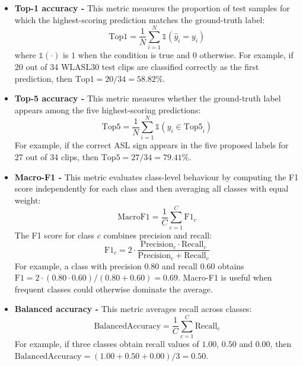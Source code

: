 \begin{itemize}
    \item \textbf{Top-1 accuracy - } This metric measures the proportion of test samples for which the
          highest-scoring prediction matches the ground-truth label:
          \begin{equation}
              \mathrm{Top1} = \frac{1}{N}\sum_{i=1}^{N}\mathbb{1}(\hat{y}_i = y_i)
          \end{equation}
          where $\mathbb{1}(\cdot)$ is $1$ when the condition is true and $0$ otherwise. For example,
          if 20 out of 34 WLASL30 test clips are classified correctly as the first prediction, then
          $\mathrm{Top1} = 20/34 = 58.82\%$.

    \item \textbf{Top-5 accuracy - } This metric measures whether the ground-truth label appears among
          the five highest-scoring predictions:
          \begin{equation}
              \mathrm{Top5} = \frac{1}{N}\sum_{i=1}^{N}\mathbb{1}(y_i \in \mathrm{Top5}_i)
          \end{equation}
          For example, if the correct ASL sign appears in the five proposed labels for 27 out of 34
          clips, then $\mathrm{Top5} = 27/34 = 79.41\%$.

    \item \textbf{Macro-F1 - } This metric evaluates class-level behaviour by computing the F1 score
          independently for each class and then averaging all classes with equal weight:
          \begin{equation}
              \mathrm{MacroF1} = \frac{1}{C}\sum_{c=1}^{C} \mathrm{F1}_c
          \end{equation}
          The F1 score for class $c$ combines precision and recall:
          \begin{equation}
              \mathrm{F1}_c =
              2 \cdot \frac{\mathrm{Precision}_c \cdot \mathrm{Recall}_c}
              {\mathrm{Precision}_c + \mathrm{Recall}_c}
          \end{equation}
          For example, a class with precision $0.80$ and recall $0.60$ obtains
          $\mathrm{F1} = 2 \cdot (0.80 \cdot 0.60)/(0.80 + 0.60) = 0.69$. Macro-F1 is useful when
          frequent classes could otherwise dominate the average.

    \item \textbf{Balanced accuracy - } This metric averages recall across classes:
          \begin{equation}
              \mathrm{BalancedAccuracy} = \frac{1}{C}\sum_{c=1}^{C}\mathrm{Recall}_c
          \end{equation}
          For example, if three classes obtain recall values of $1.00$, $0.50$ and $0.00$, then
          $\mathrm{BalancedAccuracy} = (1.00 + 0.50 + 0.00)/3 = 0.50$.
\end{itemize}

